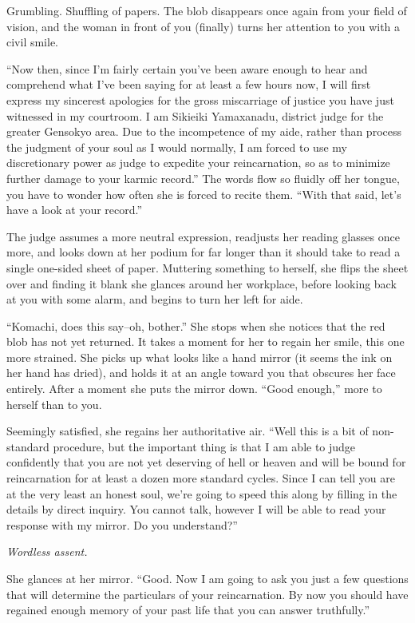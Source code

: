 \documentclass[a4paper,12pt]{book}
\begin{document}
Grumbling. Shuffling of papers. The blob disappears once again from your field of vision, and the woman in front of you (finally) turns her attention to you with a civil smile.

``Now then, since I'm fairly certain you've been aware enough to hear and comprehend what I've been saying for at least a few hours now, I will first express my sincerest apologies for the gross miscarriage of justice you have just witnessed in my courtroom. I am Sikieiki Yamaxanadu, district judge for the greater Gensokyo area. Due to the incompetence of my aide, rather than process the judgment of your soul as I would normally, I am forced to use my discretionary power as judge to expedite your reincarnation, so as to minimize further damage to your karmic record.'' The words flow so fluidly off her tongue, you have to wonder how often she is forced to recite them. ``With that said, let's have a look at your record.''

The judge assumes a more neutral expression, readjusts her reading glasses once more, and looks down at her podium for far longer than it should take to read a single one-sided sheet of paper. Muttering something to herself, she flips the sheet over and finding it blank she glances around her workplace, before looking back at you with some alarm, and begins to turn her left for aide.

``Komachi, does this say--oh, bother.'' She stops when she notices that the red blob has not yet returned. It takes a moment for her to regain her smile, this one more strained. She picks up what looks like a hand mirror (it seems the ink on her hand has dried), and holds it at an angle toward you that obscures her face entirely. After a moment she puts the mirror down. ``Good enough,'' more to herself than to you.

Seemingly satisfied, she regains her authoritative air. ``Well this is a bit of non-standard procedure, but the important thing is that I am able to judge confidently that you are not yet deserving of hell or heaven and will be bound for reincarnation for at least a dozen more standard cycles. Since I can tell you are at the very least an honest soul, we're going to speed this along by filling in the details by direct inquiry. You cannot talk, however I will be able to read your response with my mirror. Do you understand?''

\emph{Wordless assent.}

She glances at her mirror. ``Good. Now I am going to ask you just a few questions that will determine the particulars of your reincarnation. By now you should have regained enough memory of your past life that you can answer truthfully.''
\end{document}
